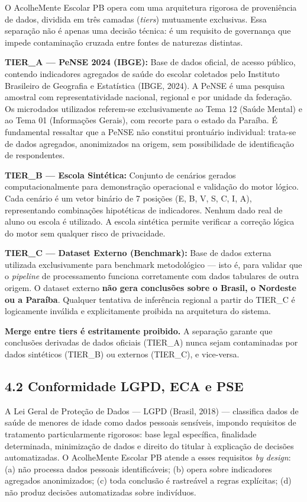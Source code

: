\documentclass[11pt]{article}
\begin{document}
O AcolheMente Escolar PB opera com uma arquitetura rigorosa de
proveniência de dados, dividida em três camadas (\emph{tiers})
mutuamente exclusivas. Essa separação não é apenas uma decisão técnica:
é um requisito de governança que impede contaminação cruzada entre
fontes de naturezas distintas.

\textbf{TIER\_A --- PeNSE 2024 (IBGE):} Base de dados oficial, de acesso
público, contendo indicadores agregados de saúde do escolar coletados
pelo Instituto Brasileiro de Geografia e Estatística (IBGE, 2024). A
PeNSE é uma pesquisa amostral com representatividade nacional, regional
e por unidade da federação. Os microdados utilizados referem-se
exclusivamente ao Tema 12 (Saúde Mental) e ao Tema 01 (Informações
Gerais), com recorte para o estado da Paraíba. É fundamental ressaltar
que a PeNSE não constitui prontuário individual: trata-se de dados
agregados, anonimizados na origem, sem possibilidade de identificação de
respondentes.

\textbf{TIER\_B --- Escola Sintética:} Conjunto de cenários gerados
computacionalmente para demonstração operacional e validação do motor
lógico. Cada cenário é um vetor binário de 7 posições (E, B, V, S, C, I,
A), representando combinações hipotéticas de indicadores. Nenhum dado
real de aluno ou escola é utilizado. A escola sintética permite
verificar a correção lógica do motor sem qualquer risco de privacidade.

\textbf{TIER\_C --- Dataset Externo (Benchmark):} Base de dados externa
utilizada exclusivamente para benchmark metodológico --- isto é, para
validar que o \emph{pipeline} de processamento funciona corretamente com
dados tabulares de outra origem. O dataset externo \textbf{não gera
conclusões sobre o Brasil, o Nordeste ou a Paraíba}. Qualquer tentativa
de inferência regional a partir do TIER\_C é logicamente inválida e
explicitamente proibida na arquitetura do sistema.

\textbf{Merge entre tiers é estritamente proibido.} A separação garante
que conclusões derivadas de dados oficiais (TIER\_A) nunca sejam
contaminadas por dados sintéticos (TIER\_B) ou externos (TIER\_C), e
vice-versa.

\subsection{4.2 Conformidade LGPD, ECA e
PSE}\label{conformidade-lgpd-eca-e-pse}

A Lei Geral de Proteção de Dados --- LGPD (Brasil, 2018) --- classifica
dados de saúde de menores de idade como dados pessoais sensíveis,
impondo requisitos de tratamento particularmente rigorosos: base legal
específica, finalidade determinada, minimização de dados e direito do
titular à explicação de decisões automatizadas. O AcolheMente Escolar PB
atende a esses requisitos \emph{by design}: (a) não processa dados
pessoais identificáveis; (b) opera sobre indicadores agregados
anonimizados; (c) toda conclusão é rastreável a regras explícitas; (d)
não produz decisões automatizadas sobre indivíduos.
\end{document}
